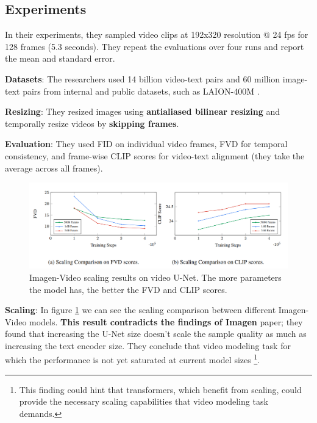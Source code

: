 \subsection{Experiments}

In their experiments, they sampled video clips at 192x320 resolution @ 24 fps for 128 frames (5.3 seconds). They repeat the evaluations over four runs and report the mean and standard error.

\textbf{Datasets}: The researchers used 14 billion video-text pairs and 60 million image-text pairs from internal and public datasets, such as LAION-400M \cite{laion_400m}.

\textbf{Resizing}: They resized images using \textbf{antialiased bilinear resizing} and temporally resize videos by \textbf{skipping frames}.

\textbf{Evaluation}: They used FID on individual video frames, FVD for temporal consistency, and frame-wise CLIP scores for video-text alignment (they take the average across all frames).

\begin{figure}
    \centering
    \includegraphics[width=1\textwidth]{images/imagen_video/scaling.png}
    \caption{Imagen-Video scaling results on video U-Net. The more parameters the model has, the better the FVD and CLIP scores.}
    \label{fig:imagen_video_scaling}
\end{figure}

\textbf{Scaling}: In figure \ref{fig:imagen_video_scaling} we can see the scaling comparison between different Imagen-Video models. \textbf{This result contradicts the findings of Imagen} \cite{imagen} paper; they found that increasing the U-Net size doesn't scale the sample quality as much as increasing the text encoder size. They conclude that video modeling task for which the performance is not yet saturated at current model sizes \footnote{This finding could hint that transformers, which benefit from scaling, could provide the necessary scaling capabilities that video modeling task demands.}.

